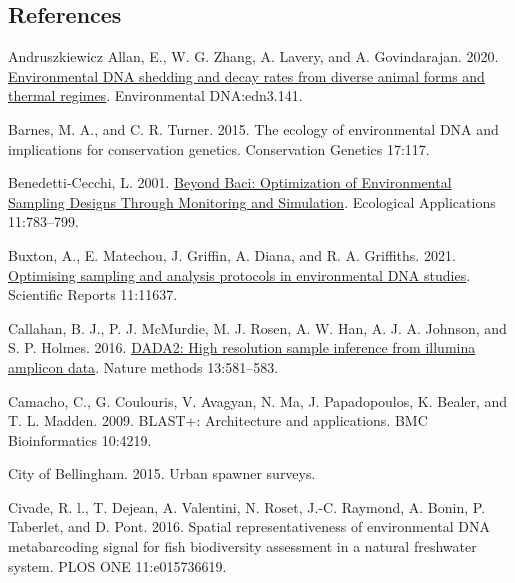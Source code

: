 \documentclass[
]{article}
\newlength{\cslhangindent}
\newlength{\cslentryspacingunit} %
\newenvironment{CSLReferences}[2] %
 {%
  \setlength{\parindent}{0pt}
  \ifodd #1
  \let\oldpar\par
  \def\par{\hangindent=\cslhangindent\oldpar}
  \fi
  \setlength{\parskip}{#2\cslentryspacingunit}
 }%
 {}
\begin{document}
\hypertarget{references}{%
\subsection*{References}\label{references}}

\hypertarget{refs}{}
\begin{CSLReferences}{1}{0}
\leavevmode{}%
Andruszkiewicz Allan, E., W. G. Zhang, A. Lavery, and A. Govindarajan.
2020. \href{https://doi.org/10.1002/edn3.141}{Environmental DNA shedding
and decay rates from diverse animal forms and thermal regimes}.
Environmental DNA:edn3.141.

\leavevmode{}%
Barnes, M. A., and C. R. Turner. 2015. The ecology of environmental DNA
and implications for conservation genetics. Conservation Genetics
17:117.

\leavevmode{}%
Benedetti-Cecchi, L. 2001.
\href{https://doi.org/10.1890/1051-0761(2001)011\%5B0783:BBOOES\%5D2.0.CO;2}{Beyond
Baci: Optimization of Environmental Sampling Designs Through Monitoring
and Simulation}. Ecological Applications 11:783--799.

\leavevmode{}%
Buxton, A., E. Matechou, J. Griffin, A. Diana, and R. A. Griffiths.
2021. \href{https://doi.org/10.1038/s41598-021-91166-7}{Optimising
sampling and analysis protocols in environmental DNA studies}.
Scientific Reports 11:11637.

\leavevmode{}%
Callahan, B. J., P. J. McMurdie, M. J. Rosen, A. W. Han, A. J. A.
Johnson, and S. P. Holmes. 2016.
\href{https://doi.org/10.1038/nmeth.3869}{DADA2: High resolution sample
inference from illumina amplicon data}. Nature methods 13:581--583.

\leavevmode{}%
Camacho, C., G. Coulouris, V. Avagyan, N. Ma, J. Papadopoulos, K.
Bealer, and T. L. Madden. 2009. BLAST+: Architecture and applications.
BMC Bioinformatics 10:4219.

\leavevmode{}%
City of Bellingham. 2015. Urban spawner surveys.

\leavevmode{}%
Civade, R. l., T. Dejean, A. Valentini, N. Roset, J.-C. Raymond, A.
Bonin, P. Taberlet, and D. Pont. 2016. Spatial representativeness of
environmental DNA metabarcoding signal for fish biodiversity assessment
in a natural freshwater system. PLOS ONE 11:e015736619.


\end{CSLReferences}
\end{document}
